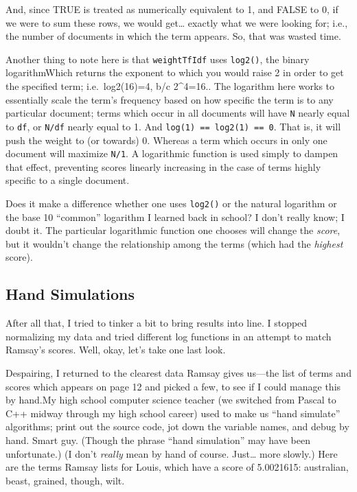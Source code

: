\documentclass[
  12pt,
]{article}
\begin{document}
And, since TRUE is treated as numerically equivalent to 1, and FALSE to
0, if we were to sum these rows, we would get\ldots{} exactly what we
were looking for; i.e., the number of documents in which the term
appears. So, that was wasted time.

Another thing to note here is that \texttt{weightTfIdf} uses
\texttt{log2()}, the binary logarithm{Which returns the exponent to
which you would raise 2 in order to get the specified term;
i.e.~log2(16)=4, b/c 2\^{}4=16.}. The logarithm here works to
essentially scale the term's frequency based on how specific the term is
to any particular document; terms which occur in all documents will have
\texttt{N} nearly equal to \texttt{df}, or \texttt{N/df} nearly equal to
1. And \texttt{log(1)\ ==\ log2(1)\ ==\ 0}. That is, it will push the
weight to (or towards) 0. Whereas a term which occurs in only one
document will maximize \texttt{N/1}. A logarithmic function is used
simply to dampen that effect, preventing scores linearly increasing in
the case of terms highly specific to a single document.

Does it make a difference whether one uses \texttt{log2()} or the
natural logarithm or the base 10 ``common'' logarithm I learned back in
school? I don't really know; I doubt it. The particular logarithmic
function one chooses will change the \emph{score}, but it wouldn't
change the relationship among the terms (which had the \emph{highest}
score).

\hypertarget{hand-simulations}{%
\subsection{Hand Simulations}\label{hand-simulations}}

After all that, I tried to tinker a bit to bring results into line. I
stopped normalizing my data and tried different log functions in an
attempt to match Ramsay's scores. Well, okay, let's take one last look.

Despairing, I returned to the clearest data Ramsay gives us---the list
of terms and scores which appears on page 12 and picked a few, to see if
I could manage this by hand.{My high school computer science teacher (we
switched from Pascal to C++ midway through my high school career) used
to make us ``hand simulate'' algorithms; print out the source code, jot
down the variable names, and debug by hand. Smart guy. (Though the
phrase ``hand simulation'' may have been unfortunate.)} (I don't
\emph{really} mean by hand of course. Just\ldots{} more slowly.) Here
are the terms Ramsay lists for Louis, which have a score of 5.0021615:
australian, beast, grained, though, wilt.
\end{document}
